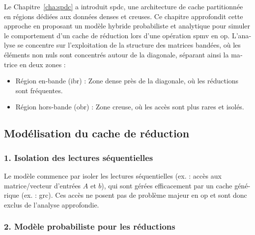 \begin{otherlanguage}{french}
Le Chapitre~\ref{cha:spdc} a introduit \acrlong{spdc}, une architecture de cache partitionnée en régions dédiées aux données denses et creuses.
Ce chapitre approfondit cette approche en proposant un modèle hybride probabiliste et analytique pour simuler le comportement d'un cache de réduction lors d'une opération \acrshort{spmv} en \acrshort{op}.
L'analyse se concentre sur l'exploitation de la structure des matrices bandées, où les éléments non nuls sont concentrés autour de la diagonale, séparant ainsi la matrice en deux zones :
\begin{itemize}
    \item Région en-bande (\acrshort{ibr}) : Zone dense près de la diagonale, où les réductions sont fréquentes.
    \item Région hors-bande (\acrshort{obr}) : Zone creuse, où les accès sont plus rares et isolés.
\end{itemize}

\subsection*{Modélisation du cache de réduction}

\subsubsection*{1. Isolation des lectures séquentielles}

Le modèle commence par isoler les lectures séquentielles (ex. : accès aux matrice/vecteur d'entrées $A$ et $b$), qui sont gérées efficacement par un cache générique (ex. : \acrshort{grc}).
Ces accès ne posent pas de problème majeur en \acrshort{op} et sont donc exclus de l'analyse approfondie.

\subsubsection*{2. Modèle probabiliste pour les réductions}


\end{otherlanguage}
